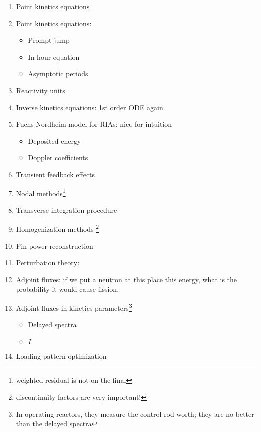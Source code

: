 \documentclass{school-22.211-notes}
\begin{document}
\clearpage
{}
\begin{enumerate}
\item Point kinetics equations


\item Point kinetics equations: 
  \begin{itemize}
    \item Prompt-jump
    \item In-hour equation
    \item Asymptotic periods
  \end{itemize}

\item Reactivity units

\item Inverse kinetics equations: 1st order ODE again. 

\item Fuchs-Nordheim model for RIAs: nice for intuition
  \begin{itemize}
    \item Deposited energy
    \item Doppler coefficients
  \end{itemize}

\item Transient feedback effects

\item Nodal methods\footnote{weighted residual is not on the final}

\item Transverse-integration procedure

\item Homogenization methods \footnote{discontinuity factors are very important!}

\item Pin power reconstruction

\item Perturbation theory: 

\item Adjoint fluxes: if we put a neutron at this place this energy, what is the probability it would cause fission. 

\item Adjoint fluxes in kinetics parameters\footnote{In operating reactors, they measure the control rod worth; they are no better than the delayed spectra}
  \begin{itemize}
  \item Delayed spectra
  \item $\bar{I}$
  \end{itemize}

\item Loading pattern optimization
\end{enumerate}
\end{document}

